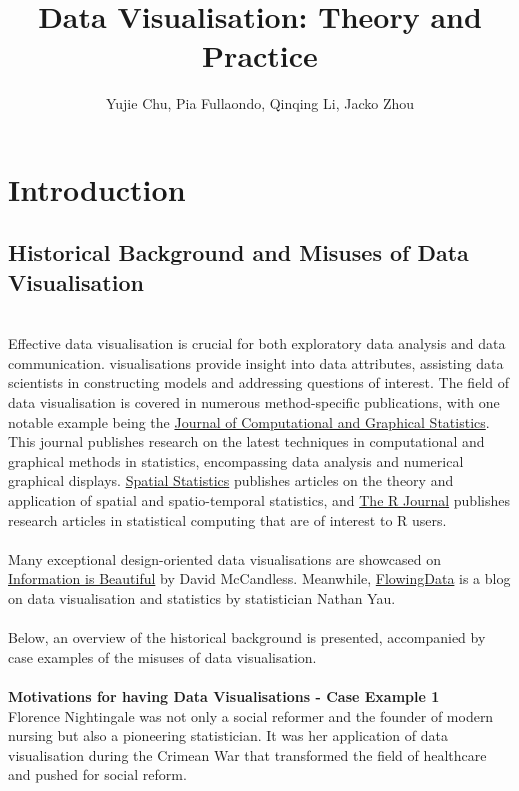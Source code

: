 \documentclass{article}\usepackage[]{graphicx}\usepackage[]{xcolor}
\title{Data Visualisation: Theory and Practice}
\author{Yujie Chu, Pia Fullaondo, Qinqing Li, Jacko Zhou}
\begin{document}
\newpage
\maketitle 
\tableofcontents
\newpage 

\section{Introduction}

\subsection{Historical Background and Misuses of Data Visualisation}
\\Effective data visualisation is crucial for both exploratory data analysis and data communication. visualisations provide insight into data attributes, assisting data scientists in constructing models and addressing questions of interest. The field of data visualisation is covered in numerous method-specific publications, with one notable example being the \href{https://www.tandfonline.com/journals/ucgs20}{Journal of Computational and Graphical Statistics}. This journal publishes research on the latest techniques in computational and graphical methods in statistics, encompassing data analysis and numerical graphical displays. \href{https://www.sciencedirect.com/journal/spatial-statistics}{Spatial Statistics} publishes articles on the theory and application of spatial and spatio-temporal statistics, and \href{https://journal.r-project.org}{The R Journal} publishes research articles in statistical computing that are of interest to R users.
\\  
\\Many exceptional design-oriented data visualisations are showcased on \href{https://informationisbeautiful.net/}{Information is Beautiful} by David McCandless. Meanwhile, \href{https://flowingdata.com/}{FlowingData} is a blog on data visualisation and statistics by statistician Nathan Yau.
\\  
\\Below, an overview of the historical background is presented, accompanied by case examples of the misuses of data visualisation.
\\  
\\\textbf{Motivations for having Data Visualisations - Case Example 1}\\

\noindent
Florence Nightingale was not only a social reformer and the founder of modern nursing but also a pioneering statistician. It was her application of data visualisation during the Crimean War that transformed the field of healthcare and pushed for social reform.\\  
\end{document}
